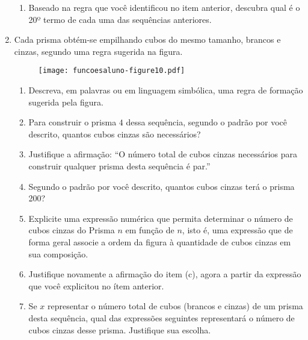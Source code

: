 \documentclass[extrafontsizes, twoside, 11pt, openright, final]{memoir}
\begin{document}
\begin{enumerate}
\begin{enumerate}
		      \item       Baseado na regra que você identificou no item anterior, descubra qual é o 20º termo de cada uma das sequências anteriores.

	      \end{enumerate}

	\item Cada prisma obtém-se empilhando cubos do mesmo tamanho, brancos e cinzas, segundo uma regra sugerida na figura.
	      \label{\detokenize{AF106-E1:fig-prismas}}

	      \begin{figure}[H]
		      \begin{center}
			      \centering

			      \texttt{[image: funcoesaluno-figure10.pdf]}
		      \end{center}
	      \end{figure}
	      \begin{enumerate}
		      \item       Descreva, em palavras ou em linguagem simbólica, uma regra de formação sugerida pela figura.

		      \item       Para construir o prisma $4$ dessa sequência, segundo o padrão por você descrito, quantos cubos cinzas são necessários?

		      \item       Justifique a afirmação: “O número total de cubos cinzas necessários para construir qualquer prisma desta sequência é par.”

		      \item       Segundo o padrão por você descrito, quantos cubos cinzas terá o prisma 200?

		      \item       Explicite uma expressão numérica que permita determinar o número de cubos cinzas do Prisma $n$ em função de $n$, isto é, uma expressão que de forma geral associe a ordem da figura à quantidade de cubos cinzas em sua composição.

		      \item       Justifique novamente a afirmação do item (c), agora a partir da expressão que você explicitou no ítem anterior.

		      \item       Se $x$ representar o número total de cubos (brancos e cinzas) de um prisma desta sequência, qual das expressões seguintes representará o número de cubos cinzas desse prisma. Justifique sua escolha.


\end{enumerate}
\end{enumerate}
\end{document}
